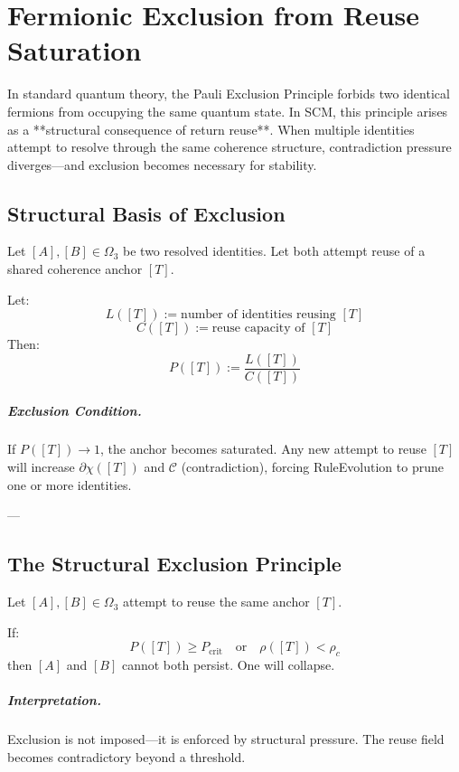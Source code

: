 \chapter{Fermionic Exclusion from Reuse Saturation} \label{chapter:exclusion}

In standard quantum theory, the Pauli Exclusion Principle forbids two identical fermions from occupying the same quantum state. In SCM, this principle arises as a **structural consequence of return reuse**. When multiple identities attempt to resolve through the same coherence structure, contradiction pressure diverges—and exclusion becomes necessary for stability.

\section{Structural Basis of Exclusion}

Let $[A], [B] \in \Omega_3$ be two resolved identities. Let both attempt reuse of a shared coherence anchor $[T]$.

\begin{definition}
Let:
\[
L([T]) := \text{number of identities reusing } [T]
\]
\[
C([T]) := \text{reuse capacity of } [T]
\]
Then:
\[
P([T]) := \frac{L([T])}{C([T])}
\]
\end{definition}

\paragraph{Exclusion Condition.}  
If $P([T]) \to 1$, the anchor becomes saturated. Any new attempt to reuse $[T]$ will increase $\partial \chi([T])$ and $\mathcal{C}$ (contradiction), forcing RuleEvolution to prune one or more identities.

---

\section{The Structural Exclusion Principle}

\begin{proposition}
\label{prop:exclusion}
Let $[A], [B] \in \Omega_3$ attempt to reuse the same anchor $[T]$.

If:
\[
P([T]) \geq P_{\text{crit}} \quad \text{or} \quad \rho([T]) < \rho_c
\]
then $[A]$ and $[B]$ cannot both persist. One will collapse.
\end{proposition}

\paragraph{Interpretation.}  
Exclusion is not imposed—it is enforced by structural pressure. The reuse field becomes contradictory beyond a threshold.

